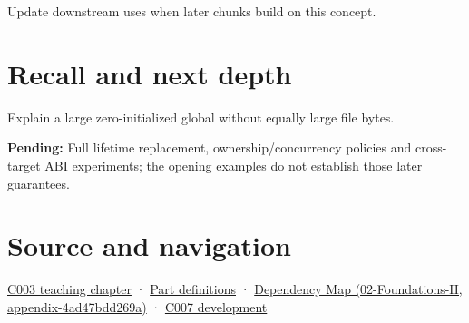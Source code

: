 Update downstream uses when later chunks build on this concept.

\section{Recall and next depth}\label{appendix-17c93c4c2f19-recall-and-next-depth}

Explain a large zero-initialized global without equally large file bytes.

\textbf{Pending:} Full lifetime replacement, ownership/concurrency policies and cross-target ABI experiments; the opening examples do not establish those later guarantees.

\section{Source and navigation}\label{appendix-17c93c4c2f19-source-and-navigation}

\href{Continuous\%20Notes/Computing\%20Foundations\%20-\%20From\%20Bits\%20to\%20C++\%20and\%20Systems\%20APIs\#Where\%20the\%20bytes\%20live}{C003 teaching chapter} · \hyperref[appendix-fd090d982a15-m003---parts-41-60]{Part definitions} · \href{../02-Foundations-II/main.pdf\#nameddest=appendix-4ad47bdd269a}{Dependency Map (02-Foundations-II, appendix-4ad47bdd269a)} · \href{Continuous\%20Notes/Computing\%20Foundations\%20-\%20From\%20Bits\%20to\%20C++\%20and\%20Systems\%20APIs\#A\%20name\%20does\%20not\%20decide\%20how\%20long\%20storage\%20lasts}{C007 development}
